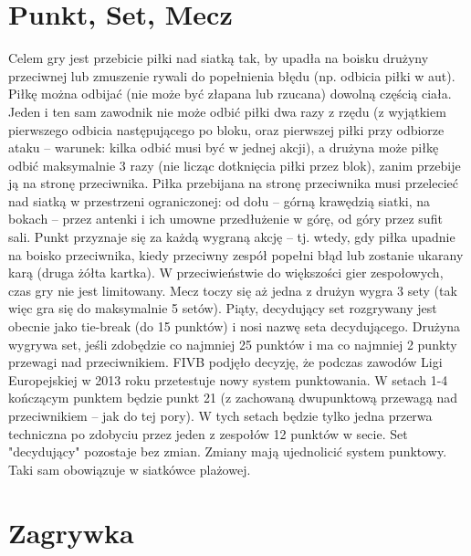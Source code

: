 \documentclass[14pt,oneside,a4paper]{book}
\theoremstyle{break}
\begin{document}
\section {Punkt, Set, Mecz}

Celem gry jest przebicie piłki nad siatką tak, by upadła na boisku drużyny przeciwnej lub zmuszenie rywali do popełnienia błędu (np. odbicia piłki w aut). Piłkę można odbijać (nie może być złapana lub rzucana) dowolną częścią ciała. Jeden i ten sam zawodnik nie może odbić piłki dwa razy z rzędu (z wyjątkiem pierwszego odbicia następującego po bloku, oraz pierwszej piłki przy odbiorze ataku – warunek: kilka odbić musi być w jednej akcji), a drużyna może piłkę odbić maksymalnie 3 razy (nie licząc dotknięcia piłki przez blok), zanim przebije ją na stronę przeciwnika.
Piłka przebijana na stronę przeciwnika musi przelecieć nad siatką w przestrzeni ograniczonej: od dołu – górną krawędzią siatki, na bokach – przez antenki i ich umowne przedłużenie w górę, od góry przez sufit sali.
Punkt przyznaje się za każdą wygraną akcję – tj. wtedy, gdy piłka upadnie na boisko przeciwnika, kiedy przeciwny zespół popełni błąd lub zostanie ukarany karą (druga żółta kartka).
W przeciwieństwie do większości gier zespołowych, czas gry nie jest limitowany. Mecz toczy się aż jedna z drużyn wygra 3 sety (tak więc gra się do maksymalnie 5 setów). Piąty, decydujący set rozgrywany jest obecnie jako tie-break (do 15 punktów) i nosi nazwę seta decydującego. Drużyna wygrywa set, jeśli zdobędzie co najmniej 25 punktów i ma co najmniej 2 punkty przewagi nad przeciwnikiem.
FIVB podjęło decyzję, że podczas zawodów Ligi Europejskiej w 2013 roku przetestuje nowy system punktowania. W setach 1-4 kończącym punktem będzie punkt 21 (z zachowaną dwupunktową przewagą nad przeciwnikiem – jak do tej pory). W tych setach będzie tylko jedna przerwa techniczna po zdobyciu przez jeden z zespołów 12 punktów w secie. Set "decydujący" pozostaje bez zmian. Zmiany mają ujednolicić system punktowy. Taki sam obowiązuje w siatkówce plażowej.

\section {Zagrywka}
\end{document}
